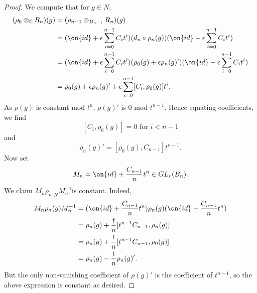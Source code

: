 \documentclass[12 pt]{amsart}
\theoremstyle{plain}
\newtheorem{proposition}[subsubsection]{Proposition}
\theoremstyle{definition}
\theoremstyle{remark}
\numberwithin{equation}{section}
\begin{document}
\begin{proof}
We compute that for $g\in N$,
\begin{align*}
	(\rho_0\otimes_{\mathbb{C}} R_n)(g) &= (\rho_{n-1}\otimes_{B_{n-1}}R_n)(g)\\
	&=(\on{id}+\epsilon\sum_{i=0}^{n-1}C_it^i)(d_n\circ \rho_n(g))(\on{id}-\epsilon\sum_{i=0}^{n-1}C_it^i)\\
	&=(\on{id}+\epsilon\sum_{i=0}^{n-1}C_it^i)(\rho_0(g)+\epsilon\rho_n(g)')(\on{id}-\epsilon\sum_{i=0}^{n-1}C_it^i)\\
&=\rho_0(g)+\epsilon\rho_n(g)'+\epsilon\sum_{i=0}^{n-1}[C_i, \rho_{0}(g)]t^i.
\end{align*}
As $\rho(g)$ is constant mod $t^n$, $\rho(g)'$ is $0$ mod $t^{n-1}$. Hence equating coefficients, we find $$[C_i, \rho_0(g)]=0 \text{ for $i<n-1$}$$ and  $$\rho_n(g)'=[\rho_0(g), C_{n-1}]t^{n-1}.$$
Now set $$M_n=\on{id}+\frac{C_{n-1}}{n}t^n\in GL_r(B_n).$$ We claim $M_n\rho_n|_N M_n^{-1}$is constant. Indeed,
\begin{align*}
M_n\rho_n(g) M_n^{-1} &= (\on{id}+\frac{C_{n-1}}{n}t^n)\rho_n(g)(\on{id}-\frac{C_{n-1}}{n}t^n)\\
&=\rho_n(g)+\frac{t}{n}[t^{n-1}C_{n-1}, \rho_n(g)]\\
&=\rho_n(g)+\frac{t}{n}[t^{n-1}C_{n-1}, \rho_0(g)]\\
&=\rho_n(g)-\frac{t}{n}\rho_n(g)'.
\end{align*}
But the only non-vanishing coefficient of $\rho(g)'$ is the coefficient of $t^{n-1}$, so the above expression is constant as desired.
\end{proof}


	
\end{document}
